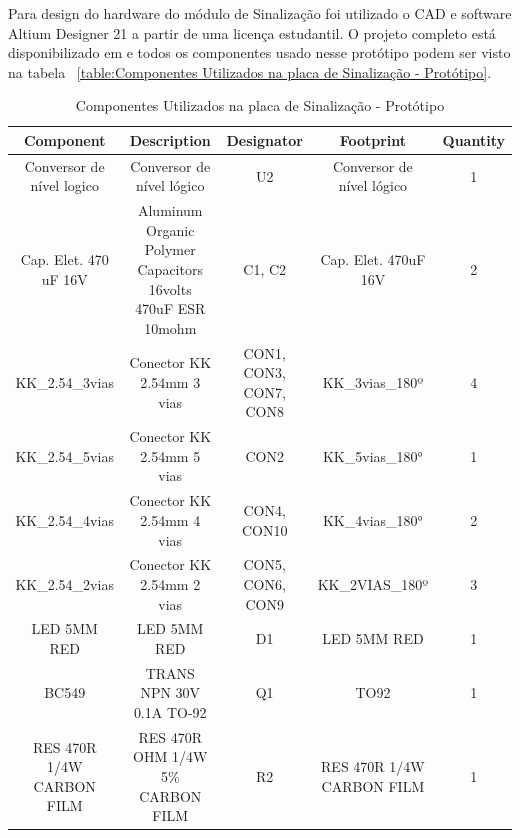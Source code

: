 \documentclass[../delivery_hospital_report.tex]{subfiles}
\begin{document}
Para design do hardware do módulo de Sinalização foi utilizado o CAD e software Altium Designer 21 \cite{altium21} a partir de uma licença estudantil. O projeto completo está disponibilizado em \cite{github_modulos} e todos os componentes usado nesse protótipo podem ser visto na tabela ~\ref{table:Componentes Utilizados na placa de Sinalização - Protótipo}.

\begin{table}[!h]
\caption{Componentes Utilizados na placa de Sinalização - Protótipo}
\centering
\begin{adjustbox}{width=\columnwidth,center}
\begin{tabular}{|c|c|c|c|c|}
\hline
Component                   & Description                                                    & Designator               & Footprint                   & Quantity \\ \hline
Conversor de   nível logico & Conversor de nível   lógico                                    & U2                       & Conversor de nível   lógico & 1        \\ \hline
Cap. Elet. 470   uF 16V     & Aluminum Organic   Polymer Capacitors 16volts 470uF ESR 10mohm & C1, C2                   & Cap. Elet. 470uF 16V        & 2        \\ \hline
KK\_2.54\_3vias             & Conector KK 2.54mm 3   vias                                    & CON1, CON3, CON7,   CON8 & KK\_3vias\_180º             & 4        \\ \hline
KK\_2.54\_5vias             & Conector KK 2.54mm 5   vias                                    & CON2                     & KK\_5vias\_180°             & 1        \\ \hline
KK\_2.54\_4vias             & Conector KK 2.54mm 4   vias                                    & CON4, CON10              & KK\_4vias\_180°             & 2        \\ \hline
KK\_2.54\_2vias             & Conector KK 2.54mm 2   vias                                    & CON5, CON6, CON9         & KK\_2VIAS\_180º             & 3        \\ \hline
LED 5MM RED                 & LED 5MM RED                                                    & D1                       & LED 5MM RED                 & 1        \\ \hline
BC549                       & TRANS NPN 30V 0.1A   TO-92                                     & Q1                       & TO92                        & 1        \\ \hline
RES 470R 1/4W   CARBON FILM & RES 470R OHM 1/4W 5\%   CARBON FILM                            & R2                       & RES 470R 1/4W CARBON   FILM & 1        \\ \hline

\end{tabular}
\end{adjustbox}
\end{table}
\end{document}
